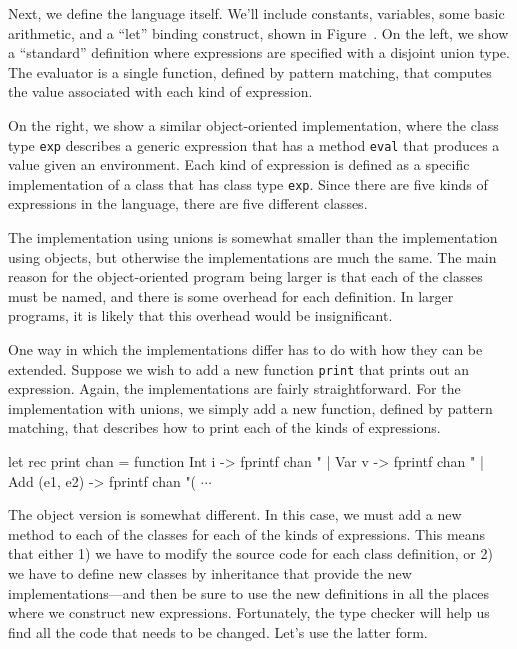Next, we define the language itself.  We'll include constants,
variables, some basic arithmetic, and a ``let'' binding construct,
shown in Figure~.  On the left, we
show a ``standard'' definition where expressions are specified with a
disjoint union type.  The evaluator is a single function, defined by
pattern matching, that computes the value associated with each kind of
expression.

On the right, we show a similar object-oriented implementation, where
the class type \hbox{\lstinline$exp$} describes a generic expression that
has a method \hbox{\lstinline$eval$} that produces a value given an
environment.  Each kind of expression is defined as a specific
implementation of a class that has class type \hbox{\lstinline$exp$}.  Since
there are five kinds of expressions in the language, there are five
different classes.

The implementation using unions is somewhat smaller than the
implementation using objects, but otherwise the implementations are
much the same.  The main reason for the object-oriented program being larger is that each
of the classes must be named, and there is some overhead for each
definition.  In larger programs, it is likely that this overhead would
be insignificant.


One way in which the implementations differ has to do with how they
can be extended.  Suppose we wish to add a new
function \hbox{\lstinline$print$} that prints out an expression.  Again,
the implementations are fairly straightforward.  For the
implementation with unions, we simply add a new function, defined by
pattern matching, that describes how to print each of the kinds of
expressions.

\begin{ocaml}
let rec print chan = function
   Int i -> fprintf chan "%
 | Var v -> fprintf chan "%
 | Add (e1, e2) ->
     fprintf chan "(%
 $\cdots$
\end{ocaml}
%
The object version is somewhat different.  In this case, we must add a
new method to each of the classes for each of the kinds of
expressions.  This means that either 1) we have to modify the source
code for each class definition, or 2) we have to define new classes by
inheritance that provide the new implementations---and then be sure to
use the new definitions in all the places where we construct new
expressions.  Fortunately, the type checker will help us find all the
code that needs to be changed.  Let's use the latter form.

